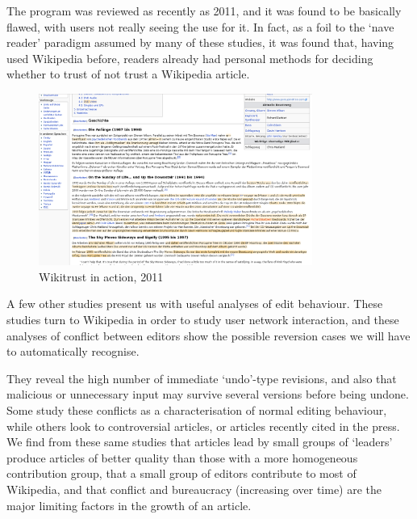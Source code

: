 The program was reviewed as recently as 2011,\cite{Lucassen2011} and
it was found to be basically flawed, with users not really seeing the
use for it. In fact, as a foil to the `nave reader' paradigm
assumed by many of these studies, it was found that, having used
Wikipedia before, readers already had personal methods for deciding
whether to trust of not trust a Wikipedia article. 

\begin{figure}
  \centering
  \includegraphics[width=0.8\textwidth,clip=true,resolution=300]{img/wikitrust.png}
  \caption{Wikitrust in action, 2011}
  \label{fig:wikitrust}
\end{figure}

A few other studies present us with useful analyses of edit
behaviour. These studies turn to Wikipedia in order to study user
network interaction, and these analyses of conflict between editors
show the possible reversion cases we will have to automatically
recognise. 

They reveal the high number of immediate `undo'-type revisions, and
also that malicious or unnecessary input may survive several versions
before being undone. Some study these conflicts as a characterisation
of normal editing
behaviour,\cite{Kittur2007}\cite{Kittur2009}\cite{Kittur2010}\cite{Potthast2008}
while others look to controversial articles,\cite{Iba2010} or articles
recently cited in the press.\cite{Lih2004} We find from these same
studies that articles lead by small groups of `leaders' produce
articles of better quality than those with a more homogeneous
contribution group, that a small group of editors contribute to most
of Wikipedia, and that conflict and bureaucracy (increasing over time)
are the major limiting factors in the growth of an
article.\cite{Suh2009} 
